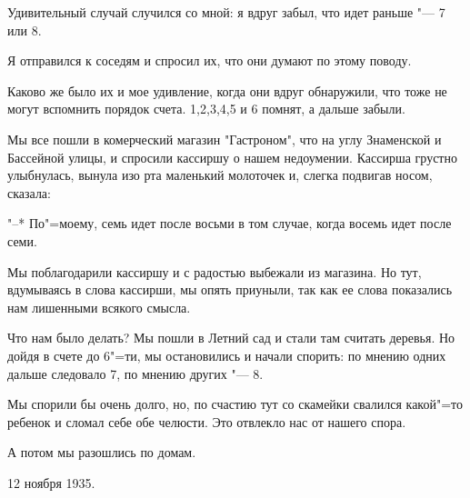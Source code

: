 Удивительный случай случился со мной: я
вдруг забыл, что идет раньше "--- 7 или 8.
    
Я отправился к соседям и спросил их, что
они думают по этому поводу.
    
Каково же было их и мое удивление, когда
они вдруг обнаружили, что тоже не могут
вспомнить порядок счета. 1,2,3,4,5 и 6 
помнят, а дальше забыли.
    
Мы все пошли в комерческий магазин "Гастроном", 
что на углу Знаменской и Бассейной
улицы, и спросили кассиршу о нашем недоумении. 
Кассирша грустно улыбнулась, вынула изо
рта маленький молоточек и, слегка подвигав
носом, сказала:
    
"--* По"=моему, семь идет после восьми в том
случае, когда восемь идет после семи.
    
Мы поблагодарили кассиршу и с радостью
выбежали из магазина. Но тут, вдумываясь в
слова кассирши, мы опять приуныли, так как
ее слова показались нам лишенными всякого
смысла.
    
Что нам было делать? Мы пошли в Летний
сад и стали там считать деревья. Но дойдя в
счете до 6"=ти, мы остановились и начали спорить: 
по мнению одних дальше следовало 7, по
мнению других "--- 8.
    
Мы спорили бы очень долго, но, по счастию 
тут со скамейки свалился какой"=то ребенок 
и сломал себе обе челюсти. Это отвлекло
нас от нашего спора.
    
А потом мы разошлись по домам.
\begin{flushright}
    12 ноября 1935.
\end{flushright}               